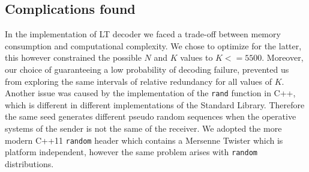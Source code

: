 \subsection{Complications found}
In the implementation of LT decoder we faced a trade-off between memory consumption and computational complexity. We chose to optimize for the latter, this however constrained the possible $N$ and $K$ values to $K <= 5500$. Moreover, our choice of guaranteeing a low probability of decoding failure, prevented us from exploring the same intervals of relative redundancy for all values of $K$. Another issue was caused by the implementation of the \texttt{rand} function in C++, which is different in different implementations of the Standard Library. Therefore the same seed generates different pseudo random sequences when the operative systems of the sender is not the same of the receiver. We adopted the more modern C++11 \texttt{random} header which contains a Mersenne Twister which is platform independent, however the same problem arises with \texttt{random} distributions.


